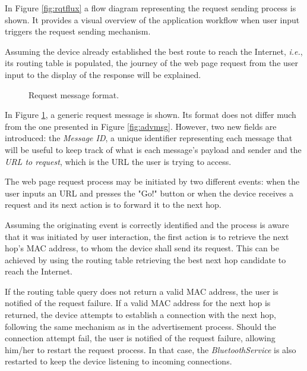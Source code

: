 In Figure \ref{fig:rqtflux} a flow diagram representing the request sending process is shown. It provides a visual overview of the application workflow when user input triggers the request sending mechanism.

Assuming the device already established the best route to reach the Internet, \textit{i.e.}, its routing table is populated, the journey of the web page request from the user input to the display of the response will be explained.

\begin{figure}[ht]
	\noindent{}
	\caption{\label{fig:rqtmsg} Request message format.}
\end{figure}

In Figure \ref{fig:rqtmsg}, a generic request message is shown. Its format does not differ much from the one presented in Figure \ref{fig:advmsg}. However, two new fields are introduced: the \textit{Message ID}, a unique identifier representing each message that will be useful to keep track of what is each message's payload and sender and the \textit{\gls{URL} to request}, which is the \gls{URL} the user is trying to access.

The web page request process may be initiated by two different events: when the user inputs an \gls{URL} and presses the "Go!" button or when the device receives a request and its next action is to forward it to the next hop.

Assuming the originating event is correctly identified and the process is aware that it was initiated by user interaction, the first action is to retrieve the next hop's \gls{MAC} address, to whom the device shall send its request. This can be achieved by using the routing table retrieving the best next hop candidate to reach the Internet.

If the routing table query does not return a valid \gls{MAC} address, the user is notified of the request failure. If a valid \gls{MAC} address for the next hop is returned, the device attempts to establish a connection with the next hop, following the same mechanism as in the advertisement process. Should the connection attempt fail, the user is notified of the request failure, allowing him/her to restart the request process. In that case, the \textit{BluetoothService} is also restarted to keep the device listening to incoming connections.

